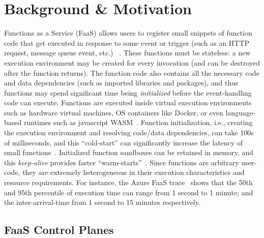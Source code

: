 \section{Background \& Motivation}
\label{sec:bg}

Functions as a Service (FaaS) allows users to register small snippets of function code that get executed in response to some event or trigger (such as an HTTP request, message queue event, etc.)
~\cite{serverless-cacm-21, aws-lambda, google-functions,azure-functions}. 
These functions must be stateless: a new execution environment may be created for every invocation (and can be destroyed after the function returns). 
The function code also contains all the necessary code and data dependencies (such as imported libraries and packages), and thus functions may spend significant time being \emph{initialized} before the event-handling code can execute. 
Functions are executed inside virtual execution environments such as hardware virtual machines, OS containers like Docker, or even language-based runtimes such as javascript WASM~\cite{shillaker2020faasm}.
Function initialization, i.e., creating the execution environment and resolving code/data dependencies, can take 100s of milliseconds, and this ``cold-start'' can significantly increase the latency of small functions~\cite{du2020catalyzer, faascache-asplos21}.
Initialized function sandboxes can be retained in memory, and this \emph{keep-alive} provides faster ``warm-starts''~\cite{faascache-asplos21}. 
%
Since functions are arbitrary user-code, they are extremely heterogeneous in their execution characteristics and resource requirements. 
For instance, the Azure FaaS trace~\cite{shahrad_serverless_2020} shows that the 50th and 95th percentile of execution time can range from 1 second to 1 minute; and the inter-arrival-time from 1 second to 15 minutes respectively.

\subsection{FaaS Control Planes}
\label{sec:bg:cplane}

